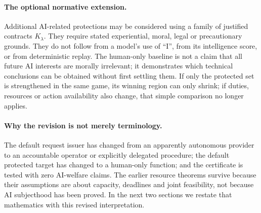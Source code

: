 \documentclass[11pt,a4paper]{article}
\theoremstyle{definition}\newtheorem{definition}{Definition}
\begin{document}
\paragraph{The optional normative extension.}
Additional AI-related protections may be considered using a family of justified contracts $K_\lambda$. They require stated experiential, moral, legal or precautionary grounds. They do not follow from a model's use of ``I'', from its intelligence score, or from deterministic replay. The human-only baseline is not a claim that all future AI interests are morally irrelevant; it demonstrates which technical conclusions can be obtained without first settling them. If only the protected set is strengthened in the same game, its winning region can only shrink; if duties, resources or action availability also change, that simple comparison no longer applies.

\paragraph{Why the revision is not merely terminology.}
The default request issuer has changed from an apparently autonomous provider to an accountable operator or explicitly delegated procedure; the default protected target has changed to a human-only function; and the certificate is tested with zero AI-welfare claims. The earlier resource theorems survive because their assumptions are about capacity, deadlines and joint feasibility, not because AI subjecthood has been proved. In the next two sections we restate that mathematics with this revised interpretation.
\end{document}
